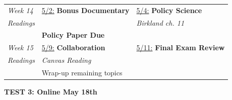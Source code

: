 \documentclass[11pt]{article}
\begin{document}
\begin{center}
\begin{longtable}{p{1.5cm} | p{7.8cm} | p{7.5cm}}
	\emph{Week 14} 	& \underline{5/2:} \textbf{Bonus Documentary} 			& \underline{5/4:} \textbf{Policy Science}		\\
	\emph{Readings}	& 														& \textit{Birkland ch. 11}							\\
					& \textbf{Policy Paper Due}								& 													\\ \hline	
	
	\emph{Week 15}	& \underline{5/9:} \textbf{Collaboration}				& \underline{5/11:} \textbf{Final Exam Review}		\\
	\emph{Readings}	& \textit{Canvas Reading} 								& 					 								\\
					& Wrap-up remaining topics								&													\\ \hline	
					
	
\end{longtable}
\end{center}
\begin{center}
	\begin{Large} \textbf{TEST 3: Online May 18th}
\end{Large}
\end{center}
\end{document}
